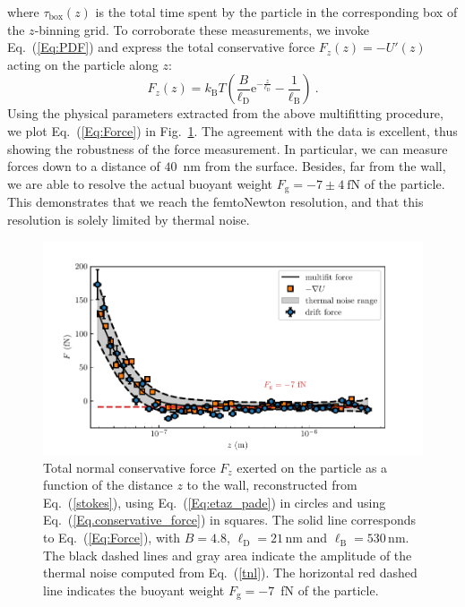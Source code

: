 where $\tau_{\textrm{box}}(z)$ is the total time spent by the particle in the corresponding box of the $z$-binning grid. To corroborate these measurements, we invoke Eq.~(\ref{Eq:PDF}) and express the total conservative force $F_z(z)=-U'(z)$ acting on the particle along $z$:
\begin{equation}
	\displaystyle F_z(z) =  k_{\mathrm{B}}T\left(\frac{B}{\ell_\mathrm{D}} \textrm{e}^{-\frac{z}{\ell_\mathrm{D}}} - \frac{1}{\ell_\mathrm{B}}\right)\ .
	\label{Eq:Force}
\end{equation} 
Using the physical parameters extracted from the above multifitting procedure, we plot Eq.~(\ref{Eq:Force}) in Fig.~\ref{fig.figure_force_total}. The agreement with the data is excellent, thus showing the robustness of the force measurement. In particular, we can measure forces down to a distance of $40$~nm from the surface. Besides, far from the wall, we are able to resolve the actual buoyant weight $F_{\textrm{g}} =- 7  \pm 4 ~ \mathrm{fN}$ of the particle. This demonstrates that we reach the femtoNewton resolution, and that this resolution is solely limited by thermal noise.
\begin{figure}[H]
	\centering
	\includegraphics{02_body/chapter3/images/trajctory_analysis/figure_force_total.pdf}
	\caption{Total normal conservative force $F_z$ exerted on the particle as a function of the distance $z$ to the wall, reconstructed from Eq.~(\ref{stokes}), using Eq.~(\ref{Eq:etaz_pade}) in circles and using Eq.~(\ref{Eq.conservative_force}) in squares. The solid line corresponds to Eq.~(\ref{Eq:Force}), with $B=4.8$, $\ell_{\mathrm{D}}=21\,\mathrm{nm}$ and $\ell_{\mathrm{B}}=530\,\mathrm{nm}$. The black dashed lines and gray area indicate the amplitude of the thermal noise computed from Eq.~(\ref{tnl}). The horizontal red dashed line indicates the buoyant weight $F_{\textrm{g}}=-7$~fN of the particle.}
	\label{fig.figure_force_total}
\end{figure}

